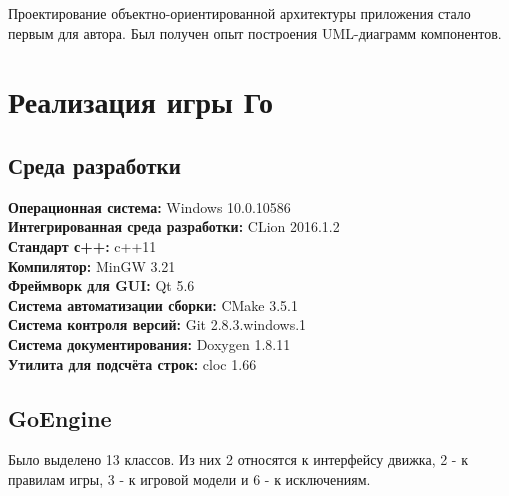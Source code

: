 Проектирование объектно-ориентированной архитектуры приложения стало первым для автора. Был получен опыт построения UML-диаграмм компонентов.

\section*{Реализация игры Го}


\subsection*{Среда разработки}

\noindent\textbf{Операционная система:} Windows 10.0.10586\\
\textbf{Интегрированная среда разработки:} CLion 2016.1.2\\
\textbf{Стандарт с++:} c++11\\
\textbf{Компилятор:} MinGW 3.21\\
\textbf{Фреймворк для GUI:} Qt 5.6\\
\textbf{Система автоматизации сборки:} CMake 3.5.1\\
\textbf{Система контроля версий:} Git 2.8.3.windows.1\\
\textbf{Система документирования:} Doxygen 1.8.11\\
\textbf{Утилита для подсчёта строк:} cloc 1.66\\

\subsection*{GoEngine}

Было выделено 13 классов. Из них 2 относятся к интерфейсу движка, 2 - к правилам игры, 3 - к игровой модели и 6 - к исключениям.\\

